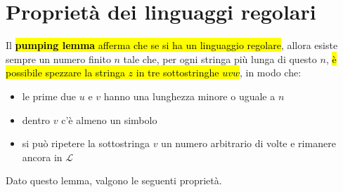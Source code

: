 \documentclass[12pt, a4paper, oneside]{book}
\begin{document}
  \section{Proprietà dei linguaggi regolari}
  Il \hl{\textbf{pumping lemma} afferma che se si ha un linguaggio regolare}, allora esiste sempre un numero finito $n$ tale che, per ogni stringa più lunga di questo $n$, \hl{è possibile spezzare la stringa $z$ in tre sottostringhe $uvw$}, in modo che:
  \begin{itemize}
    \item le prime due $u$ e $v$ hanno una lunghezza minore o uguale a $n$
    \item dentro $v$ c'è almeno un simbolo
    \item si può ripetere la sottostringa $v$ un numero arbitrario di volte e rimanere ancora in $\mathcal{L}$
  \end{itemize} 


  Dato questo lemma, valgono le seguenti proprietà.
\end{document}
